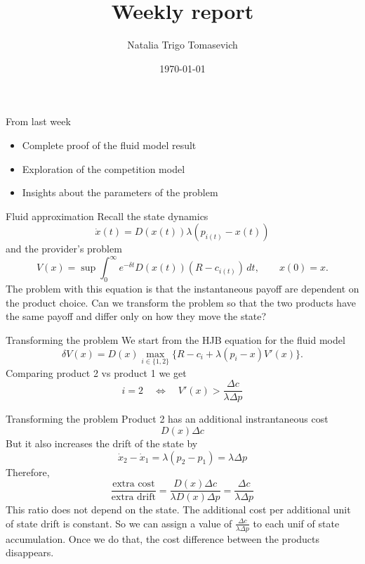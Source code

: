 \documentclass[10pt]{beamer}
\title{Weekly report}
\author{Natalia Trigo Tomasevich}
\date{\today}
\begin{document}
\frame{\titlepage}

\begin{frame}{From last week}
    \begin{itemize}[<+->]
        \item Complete proof of the fluid model result
        \item Exploration of the competition model 
        \item Insights about the parameters of the problem 
    \end{itemize}
\end{frame}

\begin{frame}{Fluid approximation}
    Recall the state dynamics
    \begin{equation}
        \dot x(t)=D(x(t))\lambda(p_{i(t)}-x(t))
    \end{equation}
    and the provider's problem 
    \begin{equation}\label{eq:fluid-value}
        V(x)=\sup\int_0^\infty e^{-\delta t}D(x(t))(R-c_{i(t)})\,dt,
        \qquad x(0)=x.
    \end{equation}
    \pause
    The problem with this equation is that the instantaneous payoff are dependent on the product choice. Can we transform the problem so that the two products have the same payoff and differ only on how they move the state? 
\end{frame}

\begin{frame}{Transforming the problem}
    We start from the HJB equation for the fluid model
    \begin{equation}\label{eq:fluid-HJB}
        \delta V(x)=D(x)\max_{i\in\{1,2\}}
        \{R-c_i+\lambda(p_i-x)V'(x)\}.
    \end{equation}
    Comparing product 2 vs product 1 we get
    \begin{equation*}
        i=2 \quad \iff \quad V'(x)>\frac{\Delta c}{\lambda\Delta p}
    \end{equation*}
\end{frame}

\begin{frame}{Transforming the problem}
    Product 2 has an additional instrantaneous cost 
    \begin{equation*}
        D(x)\Delta c 
    \end{equation*}
    But it also increases the drift of the state by 
    \begin{equation*}
        \dot x_2 - \dot x_1 = \lambda(p_2-p_1) = \lambda\Delta p
    \end{equation*}
    Therefore, 
    \begin{equation*}
        \frac{\text{extra cost}}{\text{extra drift}} = \frac{D(x)\Delta c}{\lambda D(x) \Delta p} = \frac{\Delta c}{\lambda\Delta p}
    \end{equation*}
    This ratio does not depend on the state. The additional cost per additional unit of state drift is constant. So we can assign a value of $\frac{\Delta c}{\lambda\Delta p}$ to each unif of state accumulation. Once we do that, the cost difference between the products disappears. 
\end{frame}
\end{document}
